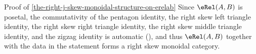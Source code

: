 \begin{Proof}{Proof of \cref{the-right-j-skew-monoidal-structure-on-erelab}}%
    Since $\eRel(A,B)$ is posetal, the commutativity of the pentagon identity, the right skew left triangle identity, the right skew right triangle identity, the right skew middle triangle identity, and the zigzag identity is automatic (), and thus $\eRel(A,B)$ together with the data in the statement forms a right skew monoidal category.
\end{Proof}
\begin{appendices}

\end{appendices}

